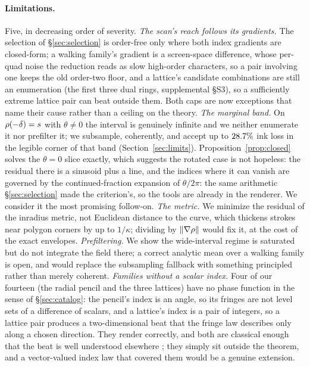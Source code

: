 \paragraph{Limitations.}
Five, in decreasing order of severity. \emph{The scan's reach follows its
gradients.} The selection of \S\ref{sec:selection} is order-free only where
both index gradients are closed-form; a walking family's gradient is a
screen-space difference, whose per-quad noise the reduction reads as slow
high-order characters, so a pair involving one keeps the old order-two floor,
and a lattice's candidate combinations are still an enumeration (the first
three dual rings, supplemental \S S3), so a sufficiently extreme lattice pair
can beat outside them. Both caps are now exceptions that name their cause
rather than a ceiling on the theory.
\emph{The marginal band.} On
$\rho(-\delta)=s$ with $\theta\neq0$ the interval is genuinely infinite and we
neither enumerate it nor prefilter it; we subsample, coherently, and accept up to
$28.7\%$ ink loss in the legible corner of that band
(Section~\ref{sec:limits}). Proposition~\ref{prop:closed} solves the $\theta=0$
slice exactly, which suggests the rotated case is not hopeless: the residual there
is a sinusoid plus a line, and the indices where it can vanish are governed by the
continued-fraction expansion of $\theta/2\pi$: the same arithmetic
\S\ref{sec:selection} made the criterion's, so the tools are already in the
renderer. We consider it the most promising follow-on. \emph{The metric.} We minimize the residual of the inradius metric, not
Euclidean distance to the curve, which thickens strokes near polygon corners by up
to $1/\kappa$; dividing by $\lVert\nabla\rho\rVert$ would fix it, at the cost of
the exact envelopes. \emph{Prefiltering.} We show the wide-interval regime is
saturated but do not integrate the field there; a correct analytic mean over a
walking family is open, and would replace the subsampling fallback with something
principled rather than merely coherent. \emph{Families without a scalar index.}
Four of our fourteen (the radial pencil and the three lattices) have no
phase function in the sense of \S\ref{sec:catalog}: the pencil's index is an angle, so its fringes
are not level sets of a difference of scalars, and a lattice's index is a pair of
integers, so a lattice pair produces a two-dimensional beat that the fringe law
describes only along a chosen direction. They render correctly, and both are
classical enough that the beat is well understood elsewhere
\cite{Amidror2009Theory,Oster1964}; they simply sit outside the theorem, and a
vector-valued index law that covered them would be a genuine extension.

